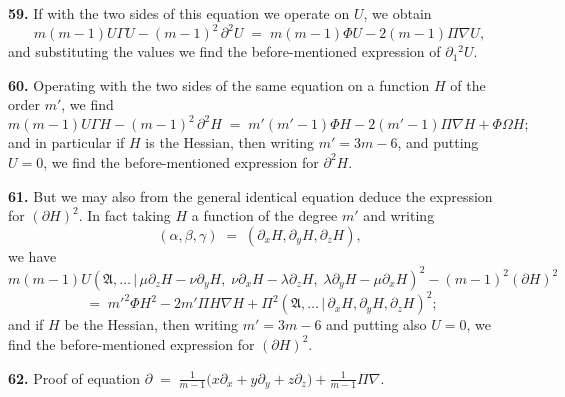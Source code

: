 \documentclass[11pt,a4paper]{article}
\providecommand{\mid}{\,|\,}
\begin{document}
\medskip

\textbf{59.} If with the two sides of this equation we operate on $U$, we obtain
\[
m(m-1)U\Gamma U - (m-1)^2\,\partial^2 U \;=\; m(m-1)\Phi U - 2(m-1)\Pi\nabla U,
\]
and substituting the values we find the before-mentioned expression of $\partial_1{}^2 U$.

\medskip

\textbf{60.} Operating with the two sides of the same equation on a function $H$ of the order $m'$, we find
\[
m(m-1)U\Gamma H - (m-1)^2\,\partial^2 H \;=\; m'(m'-1)\Phi H - 2(m'-1)\Pi\nabla H + \Phi\Omega H;
\]
and in particular if $H$ is the Hessian, then writing $m' = 3m - 6$, and putting $U = 0$, we find the before-mentioned expression for $\partial^2 H$.

\medskip

\textbf{61.} But we may also from the general identical equation deduce the expression for $(\partial H)^2$. In fact taking $H$ a function of the degree $m'$ and writing
\[
(\alpha,\beta,\gamma) \;=\; (\partial_x H,\partial_y H,\partial_z H),
\]
we have
\[
m(m-1)U(\mathfrak{A},\ldots\mid \mu\partial_z H - \nu\partial_y H,\;\nu\partial_x H - \lambda\partial_z H,\;\lambda\partial_y H - \mu\partial_x H)^2 - (m-1)^2(\partial H)^2
\]
\[
\;=\; m'^2 \Phi H^2 - 2m'\Pi H\nabla H + \Pi^2(\mathfrak{A},\ldots\mid \partial_x H,\partial_y H,\partial_z H)^2;
\]
and if $H$ be the Hessian, then writing $m' = 3m - 6$ and putting also $U = 0$, we find the before-mentioned expression for $(\partial H)^2$.

\medskip

\textbf{62.} Proof of equation $\partial \;=\; \tfrac{1}{m-1}\bigl(x\partial_x + y\partial_y + z\partial_z\bigr) + \tfrac{1}{m-1}\Pi\nabla.$
\end{document}
